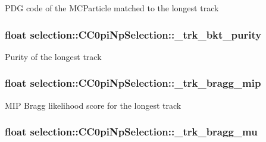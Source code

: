 P\-D\-G code of the M\-C\-Particle matched to the longest track \hypertarget{classselection_1_1CC0piNpSelection_a39a84b873306f200a2350b4804429791}{
\subsubsection[{\-\_\-trk\-\_\-bkt\-\_\-purity}]{\setlength{\rightskip}{0pt plus 5cm}float selection\-::\-C\-C0pi\-Np\-Selection\-::\-\_\-trk\-\_\-bkt\-\_\-purity\hspace{0.3cm}{\ttfamily [private]}}}\label{classselection_1_1CC0piNpSelection_a39a84b873306f200a2350b4804429791}
Purity of the longest track \hypertarget{classselection_1_1CC0piNpSelection_aec1e4d27216773ec40bc66ab5c217abc}{
\subsubsection[{\-\_\-trk\-\_\-bragg\-\_\-mip}]{\setlength{\rightskip}{0pt plus 5cm}float selection\-::\-C\-C0pi\-Np\-Selection\-::\-\_\-trk\-\_\-bragg\-\_\-mip\hspace{0.3cm}{\ttfamily [private]}}}\label{classselection_1_1CC0piNpSelection_aec1e4d27216773ec40bc66ab5c217abc}
M\-I\-P Bragg likelihood score for the longest track \hypertarget{classselection_1_1CC0piNpSelection_a9e7b081beb0ef9129f15a7fb965276f1}{
\subsubsection[{\-\_\-trk\-\_\-bragg\-\_\-mu}]{\setlength{\rightskip}{0pt plus 5cm}float selection\-::\-C\-C0pi\-Np\-Selection\-::\-\_\-trk\-\_\-bragg\-\_\-mu\hspace{0.3cm}{\ttfamily [private]}}}\label{classselection_1_1CC0piNpSelection_a9e7b081beb0ef9129f15a7fb965276f1}
